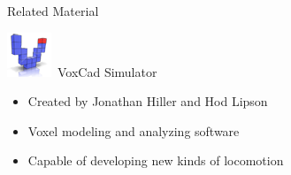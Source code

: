 \documentclass{beamer}
\begin{document}
\begin{frame}{Related Material}
\begin{block}{\includegraphics[scale=0.35]{figures/voxcad_logo.png}\	VoxCad Simulator~\cite{hiller2012dynamic}}
\begin{itemize}
\item Created by Jonathan Hiller and Hod Lipson
\item Voxel modeling and analyzing software
\item Capable of developing new kinds of locomotion
\end{itemize}
\end{block}
\end{frame}
\end{document}
